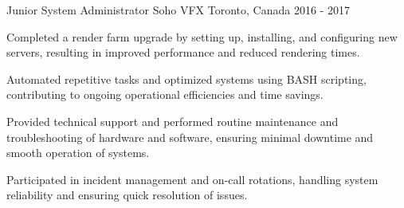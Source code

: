 \begin{cventries}
\cventry
  {Junior System Administrator}
  {Soho VFX}
  {Toronto, Canada}
  {2016 - 2017}
  {
    \begin{cvitems}
      \item Completed a render farm upgrade by setting up, installing, and configuring new servers, resulting in improved performance and reduced rendering times.
      \item Automated repetitive tasks and optimized systems using BASH scripting, contributing to ongoing operational efficiencies and time savings.
      \item Provided technical support and performed routine maintenance and troubleshooting of hardware and software, ensuring minimal downtime and smooth operation of systems.
      \item Participated in incident management and on-call rotations, handling system reliability and ensuring quick resolution of issues.
    \end{cvitems}
  }


\end{cventries}
